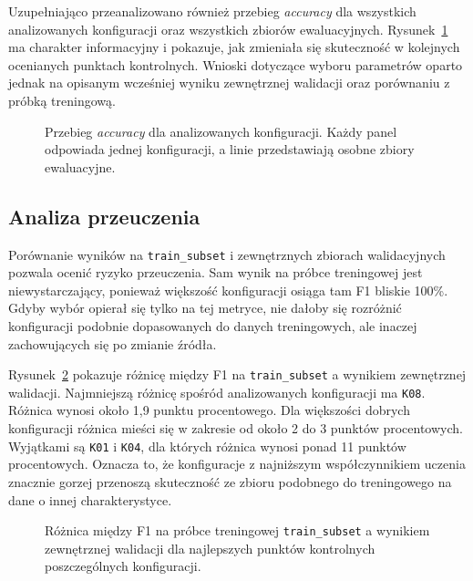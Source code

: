 Uzupełniająco przeanalizowano również przebieg \emph{accuracy} dla wszystkich
analizowanych konfiguracji oraz wszystkich zbiorów ewaluacyjnych.
Rysunek~\ref{fig:checkpoint-accuracy-grid} ma charakter informacyjny i pokazuje, jak
zmieniała się skuteczność w kolejnych ocenianych punktach kontrolnych. Wnioski
dotyczące wyboru parametrów oparto jednak na opisanym wcześniej wyniku
zewnętrznej walidacji oraz porównaniu z próbką treningową.

\begin{figure}[p]
\centering

\caption{Przebieg \emph{accuracy} dla analizowanych konfiguracji. Każdy panel
odpowiada jednej konfiguracji, a linie przedstawiają osobne zbiory ewaluacyjne.
}
\label{fig:checkpoint-accuracy-grid}
\end{figure}

\subsection{Analiza przeuczenia}

Porównanie wyników na \texttt{train\_subset} i zewnętrznych zbiorach
walidacyjnych pozwala ocenić ryzyko przeuczenia. Sam wynik na próbce
treningowej jest
niewystarczający, ponieważ większość konfiguracji osiąga tam F1 bliskie 100\%.
Gdyby wybór opierał się tylko na tej metryce, nie dałoby się rozróżnić
konfiguracji podobnie dopasowanych do danych treningowych, ale inaczej
zachowujących się po zmianie źródła.

Rysunek~\ref{fig:checkpoint-generalization-gap} pokazuje różnicę między F1 na
\texttt{train\_subset} a wynikiem zewnętrznej walidacji. Najmniejszą różnicę spośród
analizowanych konfiguracji ma \texttt{K08}. Różnica wynosi około 1,9 punktu
procentowego. Dla większości dobrych konfiguracji różnica mieści się w zakresie od
około 2 do 3 punktów procentowych. Wyjątkami są \texttt{K01} i \texttt{K04}, dla
których różnica wynosi ponad 11 punktów procentowych. Oznacza to, że konfiguracje
z najniższym współczynnikiem uczenia znacznie gorzej przenoszą skuteczność ze
zbioru podobnego do treningowego na dane o innej charakterystyce.

\begin{figure}[htbp]
\centering

\caption{Różnica między F1 na próbce treningowej \texttt{train\_subset} a
wynikiem zewnętrznej walidacji dla najlepszych punktów kontrolnych
poszczególnych konfiguracji.
}
\label{fig:checkpoint-generalization-gap}
\end{figure}

